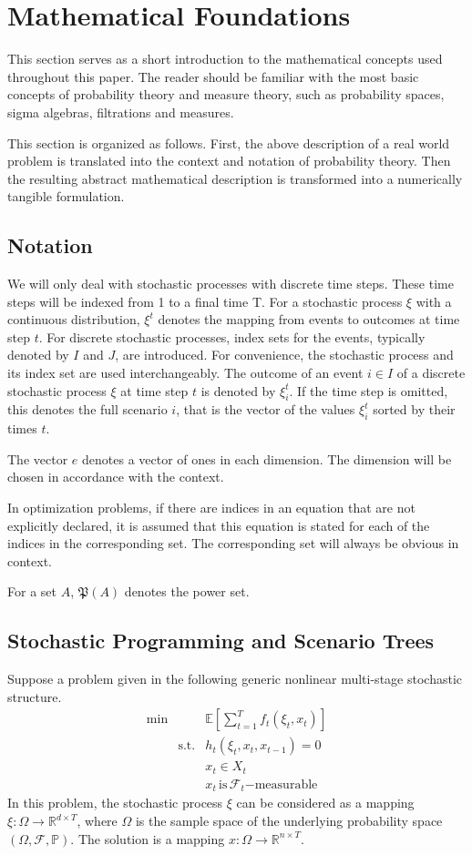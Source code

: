 \section{Mathematical Foundations}
This section serves as a short introduction to the mathematical concepts used throughout this paper. The reader should be familiar with the most basic concepts of probability theory and measure theory, such as probability spaces, sigma algebras, filtrations and measures.

This section is organized as follows. First, the above description of a real world problem is translated into the context and notation of probability theory. Then the resulting abstract mathematical description is transformed into a numerically tangible formulation.
\subsection{Notation}
We will only deal with stochastic processes with discrete time steps. These time steps will be indexed from 1 to a final time T. For a stochastic process $\xi$ with a continuous distribution, $\xi^t$ denotes the mapping from events to outcomes at time step $t$. For discrete stochastic processes, index sets for the events, typically denoted by $I$ and $J$, are introduced. For convenience, the stochastic process and its index set are used interchangeably. The outcome of an event $i\in I$ of a discrete stochastic process $\xi$ at time step $t$ is denoted by $\xi_i^t$. If the time step is omitted, this denotes the full scenario $i$, that is the vector of the values $\xi_i^t$ sorted by their times $t$.

The vector $e$ denotes a vector of ones in each dimension. The dimension will be chosen in accordance with the context. 

In optimization problems, if there are indices in an equation that are not explicitly declared, it is assumed that this equation is stated for each of the indices in the corresponding set.
The corresponding set will always be obvious in context.

For a set $A$, $\mathfrak{P}(A)$ denotes the power set.
\subsection{Stochastic Programming and Scenario Trees}
Suppose a problem given in the following generic nonlinear multi-stage stochastic structure. 
\begin{eqnarray}
  \label{eq:genericSP}
  \min &&\mathbb{E}\left[\sum_{t=1}^Tf_t(\xi_t, x_t)\right]\\
  &\mathrm{s.t.}& h_t(\xi_t, x_t, x_{t-1}) = 0\\
  &&x_t \in X_t\\
  &&x_t \, \mathrm{is}\,\mathcal{F}_t \mathrm{-measurable} \label{eqn:measurability-constraint}
\end{eqnarray}
In this problem, the stochastic process $\xi$ can be considered as a mapping $\xi:\Omega\rightarrow \mathbb{R}^{d\times T}$, where $\Omega$ is the sample space of the underlying probability space $(\Omega, \mathcal{F}, \mathbb{P})$. The solution is a mapping $x:\Omega\rightarrow \mathbb{R}^{n\times T}$.

